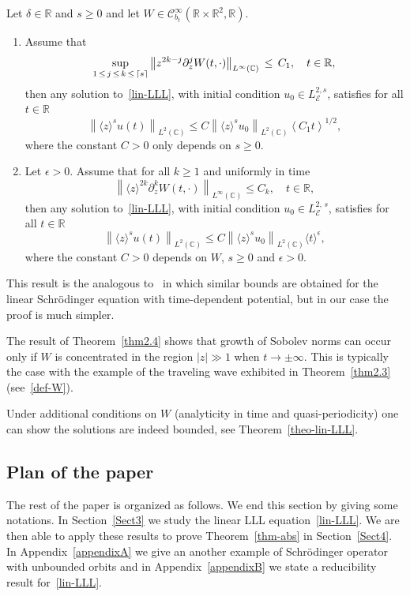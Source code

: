 \documentclass[AHL,Unicode,published]{cedram}
\DeclarePairedDelimiter\ceil{\lceil}{\rceil}
\newcommand{\C}{\mathbb{C}}
\newcommand{\R}{\mathbb{R}}
\newcommand{\E}{\mathcal{E}}
\newcommand{\clC}{\mathcal{C}}
\newcommand*\eps{\epsilon}
\newcommand{\<}{\langle}
\renewcommand{\>}{\rangle}
\newcommand*{\romanenumi}{\renewcommand*{\theenumi}{\roman{enumi}}}
\newcommand{\R}{\mathbb{R}}
\begin{document}
\begin{theo} \label{thm2.4}
Let $\delta \in \R$ and $s\geq 0$ and let $W \in \clC^{\infty}_{b_t}(\R\times \R^2, \R)$.
\begin{enumerate}\romanenumi
\item\label{theo2.4.1} Assume that
\[
\sup_{1\,\leq\,j\,\leq\,k\,\leq\,\ceil[]s}\left\|z^{2k-j}\partial^j_z W(t,\cdot)\right\|_{L^{\infty}(\C)}\,\leq\,C_{1},\quad t\in \R,
\]
then any solution to~\eqref{lin-LLL}, with initial condition $u_0 \in L^{2,s}_\E$, satisfies for all $t\in \R$
\[
\left\|\<z\>^s u(t)\right\|_{L^{2}(\C)} \leq C\left\|\<z\>^s u_0\right\|_{L^{2}(\C)} \left\< C_1 t\right\>^{1/2},
\]
where the constant $C>0$ only depends on $s\ge 0$.
\item\label{theo2.4.2} Let $\eps>0$. Assume that for all $k \geq 1 $ and uniformly in time
\begin{equation}\label{condi-W2}
\left\|\<z\>^{2k}\partial^k_z W(t,\cdot)\right\|_{L^{\infty}(\C)}\leq C_{k}, \quad t\in \R,
\end{equation}
then any solution to~\eqref{lin-LLL}, with initial condition $u_0 \in L^{2,\,s}_\E$, satisfies for all $t\in \R$
\[
\left\|\<z\>^s u(t)\right\|_{L^{2}(\C)} \leq C\left\|\<z\>^s u_0\right\|_{L^{2}(\C)} \< t\>^{\eps},
\]
where the constant $C>0$ depends on $W$, $s\geq 0$ and $\eps>0$.
\end{enumerate}
\end{theo}


This result is the analogous to~\cite{Bou99a, Delort} in which similar bounds are obtained for the linear Schr\"odinger equation with time-dependent potential, but in our case the proof is much simpler.

The result of Theorem~\ref{thm2.4} shows that growth of Sobolev norms can occur only if $W$ is concentrated in the region $|z| \gg 1$ when $t \longrightarrow \pm \infty$. This is typically the case with the example of the traveling wave exhibited in Theorem~\ref{thm2.3} (see~\eqref{def-W}).

Under additional conditions on $W$ (analyticity in time and quasi-periodicity) one can show the solutions are indeed bounded, see Theorem~\ref{theo-lin-LLL}.


\subsection{Plan of the paper}
The rest of the paper is organized as follows. We end this section by giving some notations. In Section~\ref{Sect3} we study the linear LLL equation~\eqref{lin-LLL}. We are then able to apply these results to prove Theorem~\ref{thm-abs} in Section~\ref{Sect4}. In Appendix~\ref{appendixA} we give an another example of Schr\"odinger operator with unbounded orbits and in Appendix~\ref{appendixB} we state a reducibility result for~\eqref{lin-LLL}.
\end{document}
